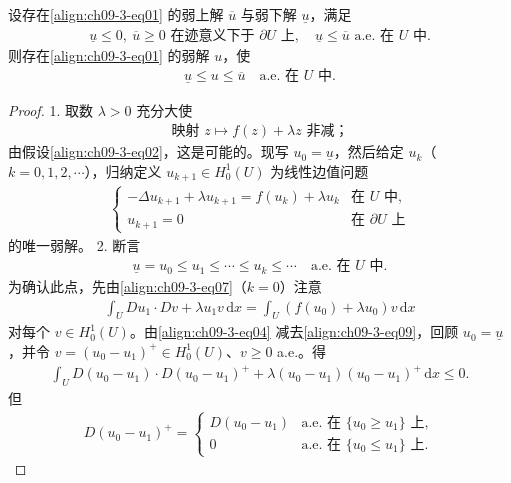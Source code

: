 \documentclass[../../main.tex]{subfiles}
\begin{document}
\begin{theorem}[上下解之间解的存在性]\label{theorem:ch09-3-1-上下解之间存在}
设存在\eqref{align:ch09-3-eq01} 的弱上解 $\overline{u}$ 与弱下解 $\underline{u}$，满足
\begin{align}
\underline{u}\leqslant 0,\ \overline{u}\geqslant 0\text{ 在迹意义下于 }\partial U\text{ 上},\quad \underline{u}\leqslant\overline{u}\text{ a.e. 在 }U\text{ 中}.\label{align:ch09-3-eq05}
\end{align}
则存在\eqref{align:ch09-3-eq01} 的弱解 $u$，使
\begin{align*}
\underline{u}\leqslant u\leqslant\overline{u}\quad\text{a.e. 在 }U\text{ 中}.
\end{align*}
\begin{proof}
1. 取数 $\lambda>0$ 充分大使
\begin{align}
\text{映射 }z\mapsto f(z)+\lambda z\text{ 非减；}\label{align:ch09-3-eq06}
\end{align}
由假设\eqref{align:ch09-3-eq02}，这是可能的。现写 $u_0=\underline{u}$，然后给定 $u_k$（$k=0,1,2,\cdots$），归纳定义 $u_{k+1}\in H_0^1(U)$ 为线性边值问题
\begin{align}
\begin{cases}
-\Delta u_{k+1}+\lambda u_{k+1}=f(u_k)+\lambda u_k&\text{在 }U\text{ 中},\\
u_{k+1}=0&\text{在 }\partial U\text{ 上}
\end{cases}\label{align:ch09-3-eq07}
\end{align}
的唯一弱解。
2. 断言
\begin{align}
\underline{u}=u_0\leqslant u_1\leqslant\cdots\leqslant u_k\leqslant\cdots\quad\text{a.e. 在 }U\text{ 中}.\label{align:ch09-3-eq08}
\end{align}
为确认此点，先由\eqref{align:ch09-3-eq07}（$k=0$）注意
\begin{align}
\int_U Du_1\cdot Dv+\lambda u_1v\,\mathrm{d}x=\int_U(f(u_0)+\lambda u_0)v\,\mathrm{d}x\label{align:ch09-3-eq09}
\end{align}
对每个 $v\in H_0^1(U)$。由\eqref{align:ch09-3-eq04} 减去\eqref{align:ch09-3-eq09}，回顾 $u_0=\underline{u}$，并令 $v=(u_0-u_1)^+\in H_0^1(U)$、$v\geqslant 0$ a.e.。得
\begin{align}
\int_U D(u_0-u_1)\cdot D(u_0-u_1)^++\lambda(u_0-u_1)(u_0-u_1)^+\,\mathrm{d}x\leqslant 0.\label{align:ch09-3-eq10}
\end{align}
但
\begin{align*}
D(u_0-u_1)^+=\begin{cases}D(u_0-u_1)&\text{a.e. 在 }\{u_0\geqslant u_1\}\text{ 上},\\ 0&\text{a.e. 在 }\{u_0\leqslant u_1\}\text{ 上}.\end{cases}

\end{align*}
\end{proof}
\end{theorem}
\end{document}
